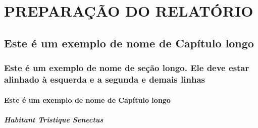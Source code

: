 \documentclass[a4paper,12pt,brazilian,oneside]{Relatorio}
\begin{document}
\begin{resumo}
\lipsum[101]

\end{resumo}



\begin{abstract}
\lipsum[101]

\end{abstract}





\tableofcontents





\textual



\lipsum[101]

\part{PREPARAÇÃO DO RELATÓRIO}

\chapter{Este é um exemplo de nome de Capítulo longo}
\lipsum[101]
\section{Este é um exemplo de nome de seção longo. 
Ele deve estar alinhado à esquerda e a segunda e 
demais linhas}
\lipsum[101]
\subsection{Este é um exemplo de nome de Capítulo longo}
\lipsum[101]
\subsubsection{Habitant Tristique Senectus}
\lipsum[101]
\end{document}
